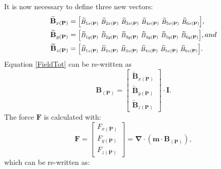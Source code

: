It is now necessary to define three new vectors:
%
\begin{align}
\mathbf{\widetilde{B}}_{x(\mathbf{P})}&= \scalebox{.85}{$\setlength\arraycolsep{2pt} \begin{bmatrix}
\widetilde{B}_{1x(\mathbf{P})} & \widetilde{B}_{2x(\mathbf{P})} & \widetilde{B}_{3x(\mathbf{P})} & \widetilde{B}_{4x(\mathbf{P})} & \widetilde{B}_{5x(\mathbf{P})} & \widetilde{B}_{6x(\mathbf{P})}
\end{bmatrix}$},
\label{Gx} \\
%
\mathbf{\widetilde{B}}_{y(\mathbf{P})}&= \scalebox{.85}{$\setlength\arraycolsep{2pt}
\begin{bmatrix}
\widetilde{B}_{1y(\mathbf{P})} & \widetilde{B}_{2y(\mathbf{P})} & \widetilde{B}_{3y(\mathbf{P})} & \widetilde{B}_{4y(\mathbf{P})} & \widetilde{B}_{5y(\mathbf{P})} & \widetilde{B}_{6y(\mathbf{P})}
\end{bmatrix}$}, and
\label{Gy} \\
%
\mathbf{\widetilde{B}}_{z(\mathbf{P})}&= \scalebox{.85}{$\setlength\arraycolsep{2pt} \begin{bmatrix}
\widetilde{B}_{1z(\mathbf{P})} & \widetilde{B}_{2z(\mathbf{P})} & \widetilde{B}_{3z(\mathbf{P})} & \widetilde{B}_{4z(\mathbf{P})} & \widetilde{B}_{5z(\mathbf{P})} & \widetilde{B}_{6z(\mathbf{P})}
\end{bmatrix}$}.
\label{Gz}
\end{align}
%
Equation \ref{FieldTot} can be re-written as
\begin{equation}
\mathbf{B}_{(\mathbf{P})}=\begin{bmatrix}
\mathbf{\widetilde{B}}_{x(\mathbf{P})}
\\
\mathbf{\widetilde{B}}_{y(\mathbf{P})}
\\ 
\mathbf{\widetilde{B}}_{z(\mathbf{P})}
\end{bmatrix}\cdot\mathbf{I}.
\end{equation}
%
The force $\mathbf{F}$ is calculated with:
%
\begin{equation}
\mathbf{F}=\begin{bmatrix}
F_{x(\mathbf{P})}
\\ 
F_{y(\mathbf{P})}
\\ 
F_{z(\mathbf{P})}
\end{bmatrix}
=\mathbf{\nabla}\cdot\left ( \mathbf{m}\cdot\mathbf{B}_{(\mathbf{P})} \right ),
\label{Force}
\end{equation}
%
which can be re-written as:
%
